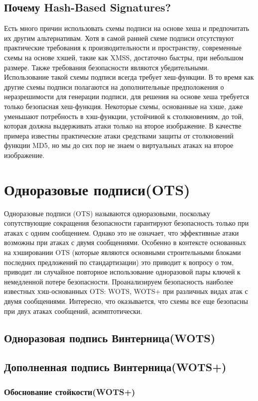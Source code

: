 \documentclass[a4paper, 14pt]{extarticle}
\begin{document}
\subsection{Почему Hash-Based Signatures?}
Есть много причин использовать схемы подписи на основе хеша и предпочитать их другим альтернативам. Хотя в самой ранней схеме подписи отсутствуют практические требования к производительности и пространству, современные схемы на основе хэшей, такие как XMSS, достаточно быстры, при небольшом размере. Также требования безопасности являются убедительными. Использование такой схемы подписи всегда требует хеш-функции. В то время как другие схемы подписи полагаются на дополнительные предположения о неразрешимости для генерации подписи, для решения на основе хеша требуется только безопасная хеш-функция. Некоторые схемы, основанные на хэше, даже уменьшают потребность в хэш-функции, устойчивой к столкновениям, до той, которая должна выдерживать атаки только на второе изображение. В качестве примера известны практические атаки средствами защиты от столкновений функции MD5, но мы до сих пор не знаем о виртуальных атаках на второе изображение.
\newpage

\section{Одноразовые подписи(OTS)}
Одноразовые подписи (OTS) называются одноразовыми, поскольку сопутствующие сокращения безопасности гарантируют безопасность только при атаках с одним сообщением. Однако это не означает, что эффективные атаки возможны при атаках с двумя сообщениями. Особенно в контексте основанных на хэшировании OTS (которые являются основными строительными блоками последних предложений по стандартизации) это приводит к вопросу о том, приводит ли случайное повторное использование одноразовой пары ключей к немедленной потере безопасности. Проанализируем безопасность наиболее известных хэш-основанных OTS: WOTS, WOTS+ при различных видах атак с двумя сообщениями. Интересно, что оказывается, что схемы все еще безопасны при двух атаках сообщений, асимптотически.
\subsection{Одноразовая подпись Винтерница(WOTS)}
\subsection{Дополненная подпись Винтерница(WOTS+)}
\subsubsection{Обоснование стойкости(WOTS+)}
\newpage
\end{document}
